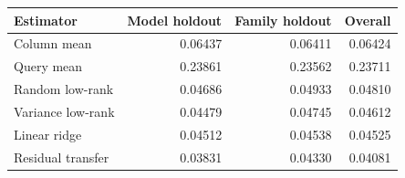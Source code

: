 
\begin{tabular}{lrrr}
\toprule
Estimator & Model holdout & Family holdout & Overall \\
\midrule
Column mean & 0.06437 & 0.06411 & 0.06424 \\
Query mean & 0.23861 & 0.23562 & 0.23711 \\
Random low-rank & 0.04686 & 0.04933 & 0.04810 \\
Variance low-rank & 0.04479 & 0.04745 & 0.04612 \\
Linear ridge & 0.04512 & 0.04538 & 0.04525 \\
Residual transfer & 0.03831 & 0.04330 & 0.04081 \\
\bottomrule
\end{tabular}
